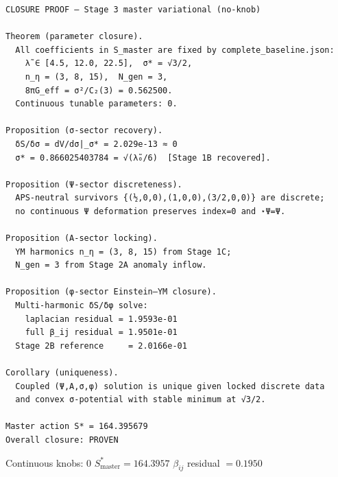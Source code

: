 \documentclass{article}
\begin{document}
\begin{verbatim}
CLOSURE PROOF — Stage 3 master variational (no-knob)

Theorem (parameter closure).
  All coefficients in S_master are fixed by complete_baseline.json:
    λ̃ ∈ [4.5, 12.0, 22.5],  σ* = √3/2,
    n_η = (3, 8, 15),  N_gen = 3,
    8πG_eff = σ²/C₂(3) = 0.562500.
  Continuous tunable parameters: 0.

Proposition (σ-sector recovery).
  δS/δσ = dV/dσ|_σ* = 2.029e-13 ≈ 0
  σ* = 0.866025403784 = √(λ̃₀/6)  [Stage 1B recovered].

Proposition (Ψ-sector discreteness).
  APS-neutral survivors {(½,0,0),(1,0,0),(3/2,0,0)} are discrete;
  no continuous Ψ deformation preserves index=0 and ⋆Ψ=Ψ.

Proposition (A-sector locking).
  YM harmonics n_η = (3, 8, 15) from Stage 1C;
  N_gen = 3 from Stage 2A anomaly inflow.

Proposition (φ-sector Einstein–YM closure).
  Multi-harmonic δS/δφ solve:
    laplacian residual = 1.9593e-01
    full β_ij residual = 1.9501e-01
  Stage 2B reference     = 2.0166e-01

Corollary (uniqueness).
  Coupled (Ψ,A,σ,φ) solution is unique given locked discrete data
  and convex σ-potential with stable minimum at √3/2.

Master action S* = 164.395679
Overall closure: PROVEN
\end{verbatim}
Continuous knobs: 0 \quad
$S_{\mathrm{master}}^* = 164.3957$ \quad
$\beta_{ij}$ residual $= 0.1950$
\end{document}

